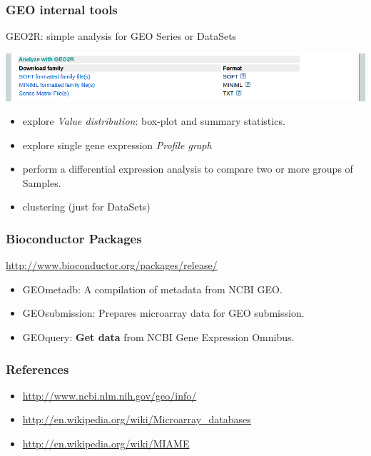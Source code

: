 \documentclass{beamer}
\begin{document}
\begin{frame}
  \frametitle{GEO internal tools}

  GEO2R: simple analysis for GEO Series or DataSets

  \begin{center}
    \href{http://www.ncbi.nlm.nih.gov/geo/geo2r/?acc=GSE37761}{\includegraphics[width=\linewidth]{geo_tools2}}
  \end{center}

  \begin{itemize}
  \item explore \textit{Value distribution}: box-plot and summary statistics.
  \item explore single gene expression \textit{Profile graph}
  \item perform a differential expression analysis to compare two or more groups of Samples.
  \item clustering (just for DataSets)
  \end{itemize}

\end{frame}


\begin{frame}
  \frametitle{Bioconductor Packages}
  
  \url{http://www.bioconductor.org/packages/release/}
  
  \bigskip
  
  \begin{itemize}
  \item GEOmetadb: A compilation of metadata from NCBI GEO.
  \item GEOsubmission: Prepares microarray data for GEO submission.
  \item GEOquery: \textbf{Get data} from NCBI Gene Expression Omnibus.
  \end{itemize}

\end{frame}



\begin{frame}
  \frametitle{References}

  \begin{itemize}
  \item \url{http://www.ncbi.nlm.nih.gov/geo/info/}
  \item \url{http://en.wikipedia.org/wiki/Microarray_databases}
  \item \url{http://en.wikipedia.org/wiki/MIAME}
  \end{itemize}

\end{frame}  

\end{document}
